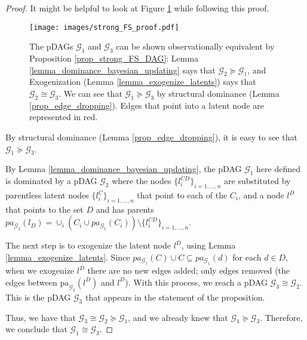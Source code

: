 \begin{proof}
    It might be helpful to look at Figure \ref{fig_strong_FS_proof} while following this proof.
    \begin{figure}[h!]
    \centering
    \texttt{[image: images/strong\_FS\_proof.pdf]}
    \caption{The pDAGs $\mathcal{G}_1$ and $\mathcal{G}_3$ can be shown observationally equivalent by Proposition \ref{prop_strong_FS_DAG}:  Lemma \ref{lemma_dominance_bayesian_updating} says that $\mathcal{G}_2\succeq\mathcal{G}_1$, and Exogenization (Lemma \ref{lemma_exogenize_latents}) says that $\mathcal{G}_2\cong\mathcal{G}_3$. We can see that $\mathcal{G}_1\succeq\mathcal{G}_3$ by structural dominance (Lemma \ref{prop_edge_dropping}). Edges that point into a latent node are represented in red.} 
    \label{fig_strong_FS_proof}
\end{figure}

    By structural dominance (Lemma \ref{prop_edge_dropping}), it is easy to see that $\mathcal{G}_1 \succeq \mathcal{G}_3$.
    
    By Lemma \ref{lemma_dominance_bayesian_updating}, the pDAG $\mathcal{G}_1$ here defined is dominated by a pDAG $\mathcal{G}_2$ where the nodes $\{l^{CD}_i\}_{i=1,...,n}$ are substituted by parentless latent nodes $\{l^{C}_i\}_{i=1,...,n}$ that point to each of the $C_i$, and a node $l^D$ that points to the set $D$ and has parents $pa_{\mathcal{G}_2}(l_D)= \cup_i ( C_i\cup pa_{\mathcal{G}_1}(C_i) )\setminus \{l^{CD}_i\}_{i=1,...,n}$. 

    The next step is to exogenize the latent node $l^D$, using Lemma \ref{lemma_exogenize_latents}. Since $pa_{\mathcal{G}_1}(C)\cup C\subseteq pa_{\mathcal{G}_1}(d)$ for each $d \in D$, when we exogenize $l^D$ there are no new edges added; only edges removed (the edges between $\text{pa}_{\mathcal{G}_2}(l^D)$ and $l^D$). With this process, we reach a pDAG $\mathcal{G}_3 \cong \mathcal{G}_2$. This is the pDAG $\mathcal{G}_3$ that appears in the statement of the proposition.

    Thus, we have that $\mathcal{G}_3\cong \mathcal{G}_2\succeq \mathcal{G}_1$, and we already knew that $\mathcal{G}_1\succeq \mathcal{G}_3$. Therefore, we conclude that $\mathcal{G}_1\cong \mathcal{G}_3$.
\end{proof}

